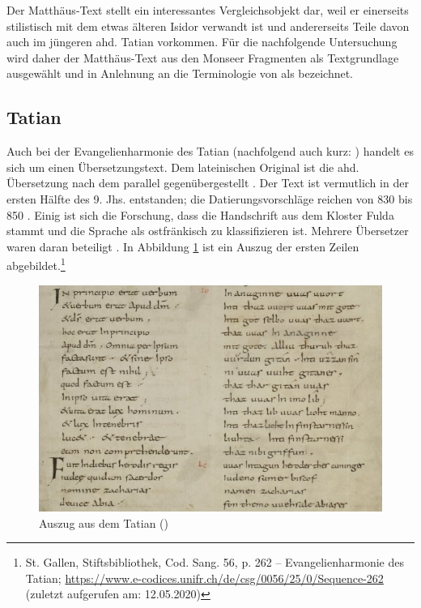 Der Matthäus-Text stellt ein interessantes Vergleichsobjekt dar, weil er  einerseits stilistisch mit dem etwas älteren Isidor verwandt ist \parencite{Hench1893,Lippert1974} und andererseits Teile davon auch im jüngeren ahd. Tatian vorkommen. Für die nachfolgende Untersuchung wird daher der Matthäus-Text aus den Monseer Fragmenten als Textgrundlage ausgewählt und in Anlehnung an die Terminologie von \textcite{Lippert1974} als  bezeichnet.
  
\subsection{Tatian}\label{sec:tatian}

Auch bei der Evangelienharmonie des Tatian (nachfolgend auch kurz: ) handelt es sich um einen Übersetzungstext. Dem lateinischen Original ist die ahd. Übersetzung nach dem  \parencite[43]{Fleischer2011} parallel gegenübergestellt \parencite[vgl. hierzu auch][128]{Masser1997}. Der Text ist vermutlich in der ersten Hälfte des 9. Jhs. entstanden; die Datierungsvorschläge reichen von 830 \parencite[LXX]{Sievers1961} bis 850 \parencite[127]{Sonderegger2003}. Einig ist sich die Forschung, dass die Handschrift aus dem Kloster Fulda stammt und die Sprache als ostfränkisch zu klassifizieren ist. Mehrere Übersetzer waren daran beteiligt \parencite[s.][31]{Masser1994}. In Abbildung \ref{abb:tatian-hand} ist ein Auszug der ersten Zeilen abgebildet.\footnote{St. Gallen, Stiftsbibliothek, Cod. Sang. 56, p. 262 –
Evangelienharmonie des Tatian; \url{https://www.e-codices.unifr.ch/de/csg/0056/25/0/Sequence-262} (zuletzt aufgerufen am: 12.05.2020)}

\begin{figure}[h]
\begin{center}
  \includegraphics[width=10 cm]{images/tatian-handschrift-ausschnitt.jpg}
\caption {Auszug aus dem Tatian ()}
\label{abb:tatian-hand}
\end{center}
\end{figure} 

